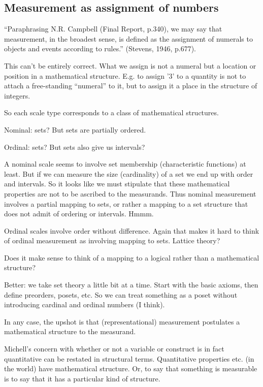 \documentclass[11pt,twoside]{article}
\begin{document}
\subsection{Measurement as assignment of numbers}

``Paraphrasing N.R. Campbell (Final Report, p.340), we may say that
measurement, in the broadest sense, is defined as the assignment of
numerals to objects and events according to rules.'' (Stevens, 1946,
p.677).

This can't be entirely correct.  What we assign is not a numeral but a
location or position in a mathematical structure.  E.g. to assign '3'
to a quantity is not to attach a free-standing ``numeral'' to it, but
to assign it a place in the structure of integers.

So each scale type corresponds to a class of mathematical structures.

Nominal:  sets?  But sets are partially ordered.

Ordinal:  sets?  But sets also give us intervals?

A nominal scale seems to involve set membership (characteristic
functions) at least.  But if we can measure the size (cardinality) of
a set we end up with order and intervals.  So it looks like we must
stipulate that these mathematical properties are not to be ascribed to
the measurands.  Thus nominal measurement involves a partial mapping
to sets, or rather a mapping to a set structure that does not admit of
ordering or intervals.  Hmmm.

Ordinal scales involve order without difference.  Again that makes it
hard to think of ordinal measurement as involving mapping to sets.
Lattice theory?

Does it make sense to think of a mapping to a logical rather than a
mathematical structure?

Better: we take set theory a little bit at a time.  Start with the
basic axioms, then define preorders, posets, etc.  So we can treat
something as a poset without introducing cardinal and ordinal numbers
(I think).

In any case, the upshot is that (representational) measurement
postulates a mathematical structure to the measurand.

Michell's concern with whether or not a variable or construct is in
fact quantitative can be restated in structural terms.  Quantitative
properties etc. (in the world) have mathematical structure.  Or, to
say that something is measurable is to say that it has a particular
kind of structure.
\end{document}
